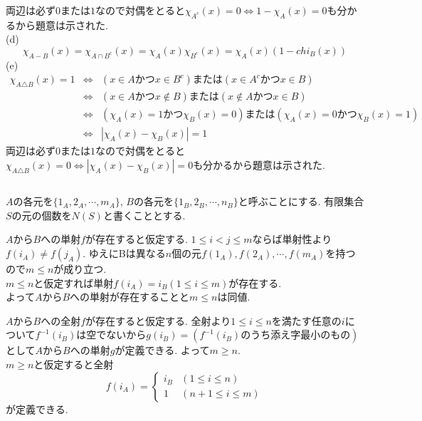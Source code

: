 \documentclass{jsarticle}
\begin{document}
両辺は必ず$0$または$1$なので対偶をとると$\chi_{A^c}(x) = 0 \Leftrightarrow 1 - \chi_A(x) = 0$も分かるから題意は示された.\\
(d)\\
\begin{equation*}
	\chi_{A - B}(x) = \chi_{A \cap B^c}(x) = \chi_A(x)\chi_{B^c}(x) = \chi_A(x)(1 - chi_B(x))
\end{equation*}
(e)\\
\begin{eqnarray*}
	\chi_{A \triangle B}(x) = 1
	&\Leftrightarrow& (x \in A かつ x \in B^c) または (x \in A^c かつ x \in B)\\
	&\Leftrightarrow& (x \in A かつ x \notin B) または (x \notin A かつ x \in B)\\
	&\Leftrightarrow& (\chi_A(x) = 1 かつ \chi_B(x) = 0) または (\chi_A(x) = 0 かつ \chi_B(x) = 1)\\
	&\Leftrightarrow& |\chi_A(x) - \chi_B(x)| = 1
\end{eqnarray*}
両辺は必ず$0$または$1$なので対偶をとると$\chi_{A \triangle B}(x) = 0 \Leftrightarrow |\chi_A(x) - \chi_B(x)| = 0$も分かるから題意は示された.\\

\subsection{} %
$A$の各元を$\{1_A, 2_A, \cdots, m_A\}$, $B$の各元を$\{1_B, 2_B, \cdots, n_B\}$と呼ぶことにする. 有限集合$S$の元の個数を$N(S)$と書くこととする.

$A$から$B$への単射$f$が存在すると仮定する. $1 \leq i < j \leq m$ならば単射性より$f(i_A) \neq f(j_A)$. ゆえにBは異なる$n$個の元$f(1_A), f(2_A), \cdots, f(m_A)$を持つので$m \leq n$が成り立つ.\\
$m \leq n$と仮定すれば単射$f(i_A) = i_B (1 \leq i \leq m)$が存在する.\\
よって$A$から$B$への単射が存在することと$m \leq n$は同値.

$A$から$B$への全射$f$が存在すると仮定する. 全射より$1 \leq i \leq n$を満たす任意の$i$について$f^{-1}(i_B)$は空でないから$g(i_B) = (f^{-1}(i_B)のうち添え字最小のもの)$として$A$から$B$への単射$g$が定義できる. よって$m \geq n$.\\
$m \geq n$と仮定すると全射\\
\begin{equation*}
	f(i_A) =
	\begin{cases}
		i_B & (1 \leq i \leq n)\\
		1 & (n + 1 \leq i \leq m)
	\end{cases}
\end{equation*}
が定義できる.
\end{document}
